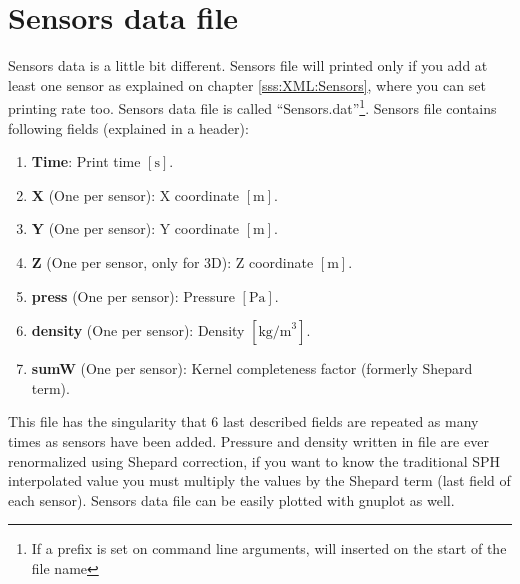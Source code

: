 \section{Sensors data file}
\label{ss:running:sensorsoutput}
%
Sensors data is a little bit different. Sensors file will printed only if you add
at least one sensor as explained on chapter \ref{sss:XML:Sensors}, where you can set
printing rate too. Sensors data file is called ``Sensors.dat''\footnote{If a prefix
is set on command line arguments, will inserted on the start of the file name}.\rc
%
Sensors file contains following fields (explained in a header):
%
\begin{enumerate}
	\item \textbf{Time}: Print time $[\mbox{s}]$.
	\item \textbf{X} (One per sensor): X coordinate $[\mbox{m}]$.
	\item \textbf{Y} (One per sensor): Y coordinate $[\mbox{m}]$.
	\item \textbf{Z} (One per sensor, only for 3D): Z coordinate $[\mbox{m}]$.
	\item \textbf{press} (One per sensor): Pressure $[\mbox{Pa}]$.
	\item \textbf{density} (One per sensor): Density $[\mbox{kg/m}^3]$.
	\item \textbf{sumW} (One per sensor): Kernel completeness factor (formerly Shepard term).
\end{enumerate}
%
This file has the singularity that 6 last described fields are repeated as many times as sensors
have been added. Pressure and density written in file are ever renormalized using Shepard
correction, if you want to know the traditional SPH interpolated value you must multiply the values
by the Shepard term (last field of each sensor).\rc
%
Sensors data file can be easily plotted with gnuplot as well.
%